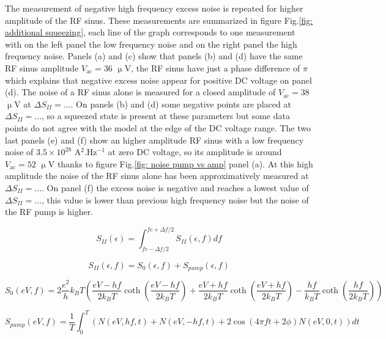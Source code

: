 The measurement of negative high frequency excess noise is repeated for higher amplitude of the RF sinus.
These measurements are summarized in figure Fig.\ref{fig: additional squeezing}, each line of the graph corresponds to one measurement with on the left panel the low frequency noise and on the right panel the high frequency noise. 
Panels (a) and (c) show that panels (b) and (d) have the same RF sinus amplitude $V_{\mathrm{ac}} = 36$ $\upmu$V, the RF sinus have just a phase difference of $\pi$ which explains that negative excess noise appear for positive DC voltage on panel (d).
The noise of a RF sinus alone is measured for a closed amplitude of $V_{\mathrm{ac}} = 38$ $\upmu$V at $\Delta S_{II} = ...$.
On panels (b) and (d) some negative points are placed at $\Delta S_{II} = ...$, so a squeezed state is present at these parameters but some data points do not agree with the model at the edge of the DC voltage range.
The two last panels (e) and (f) show an higher amplitude RF sinus with a low frequency noise of $3.5\times 10^{28}$ A$^2$.Hz$^{-1}$ at zero DC voltage, so its amplitude is around $V_{\mathrm{ac}} = 52$ $\upmu$V thanks to figure Fig.\ref{fig: noise pump vs amp} panel (a).
At this high amplitude the noise of the RF sinus alone has been approximatively measured at $\Delta S_{II} = ...$.
On panel (f) the excess noise is negative and reaches a lowest value of $\Delta S_{II} = ...$, this value is lower than previous high frequency noise but the noise of the RF pump is higher.

\begin{equation}
S_{II}\left(\epsilon\right) = \int_{fc-\Delta f/2}^{fc+\Delta f/2}S_{II}\left(\epsilon,f\right)df
\end{equation}

\begin{equation}
S_{II}\left(\epsilon,f\right) = S_{0}\left(\epsilon,f\right)+S_{pump}\left(\epsilon,f\right)
\end{equation}

\begin{equation}
S_{0}\left(eV,f\right) = 2\frac{e^{2}}{h}k_{B}T\left(\frac{eV-hf}{2k_{B}T}\coth\left(\frac{eV-hf}{2k_{B}T}\right)+\frac{eV+hf}{2k_{B}T}\coth\left(\frac{eV+hf}{2k_{B}T}\right)-\frac{hf}{k_{B}T}\coth\left(\frac{hf}{2k_{B}T}\right)\right)
\end{equation}

\begin{equation}
S_{pump}\left(eV,f\right) = \frac{1}{T}\int_{0}^{T} \left(N\left(eV,hf,t\right)+N\left(eV,-hf,t\right)+2\cos\left(4\pi ft+2\phi\right)N\left(eV,0,t\right)\right)dt
\end{equation}

